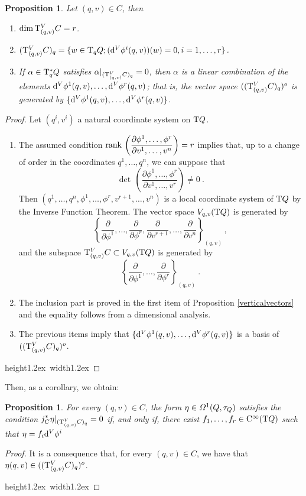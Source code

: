 \documentclass[12pt]{report}
\newtheorem{prop}[teor]{Proposition}
\def\dst{\displaystyle}
\def\derpar#1#2{\frac{\partial{#1}}{\partial{#2}}}
\def\coor#1#2#3{{#1}^{#2}, \ldots, {#1}^{#3}}
\def\moment#1#2#3{{#1}_{#2}, \ldots, {#1}_{#3}}
\def\qed{\ifvmode\removelastskip\fi
{\unskip\nobreak\hfil\penalty50\hbox{}\nobreak\hfil
\hbox{\vrule height1.2ex width1.2ex}\parfillskip=0pt
\finalhyphendemerits=0 \par\smallskip}}
\def\df{{\mit\Omega}}
\def\d{{\rm d}}
\def\Tan{{\rm T}}
\def\Cinfty{{\rm C}^\infty}
\begin{document}
\begin{prop}
Let $(q,v)\in C$, then
\begin{enumerate}
\item $\dim \Tan^V_{(q,v)}C=r$.
\item $(\Tan^V_{(q,v)}C)_{q}=\{w\in \Tan_{q}Q; (\d^V\phi^i(q,v))(w)=0, i=1,\ldots,r \}$.
\item If $\alpha\in\Tan_{q}^{*}Q$ satisfies $\alpha |_{(\Tan^V_{(q,v)}C)_{q}}=0$, then $\alpha$ is a linear combination of the elements $\d^V\phi^1(q,v), \ldots,\d^V\phi^r(q,v)$;
that is, the vector space $((\Tan_{(q,v)}^VC)_q)^o$ is generated by $\{\d^V\phi^1(q,v),\ldots,\d^V\phi^r(q,v)\}$.
\end{enumerate}
\end{prop}
\begin{proof}
Let $(q^{i}, v^{i})$ a natural coordinate system on $\Tan Q$.
\begin{enumerate}
\item The assumed condition
\(\dst {\rm rank}\,\left(\derpar{\coor{\phi}{1}{r}}{\coor{v}{1}{n}}\right)=r\) implies that, up to a change of order in the coordinates $\coor{q}{1}{n}$, we can suppose that
$$
\det\, \left(\derpar{\coor{\phi}{1}{r}}{\coor{v}{1}{r}}\right)\not= 0 \ .
$$
Then $(q^{1},\ldots,q^{n},\phi^1,\ldots,\phi^r,v^{r+1},\ldots,v^{n})$ is a local coordinate system of $\Tan Q$ by the Inverse Function Theorem. The vector space $V_{q,v}(\Tan Q)$ is generated by
$$
\left\{\derpar{}{\phi^1},\ldots,\derpar{}{\phi^r},\derpar{}{v^{r+1}},\ldots,\derpar{}{v^n}\right\}_{(q,v)}\, ,
$$
and the subspace  $\Tan^V_{(q,v)}C\subset V_{q,v}(\Tan Q)$ is generated by
$$
\left\{\derpar{}{\phi^1},\ldots,\derpar{}{\phi^r}\right\}_{(q,v)}\ .
$$
\item The inclusion part is proved in the first item of Proposition \ref{verticalvectors} and the equality follows from a dimensional analysis.
\item 
The previous items imply that $\{\d^V\phi^1(q,v),\ldots,\d^V\phi^r(q,v)\}$ is a basis of $
((\Tan_{(q,v)}^VC)_q)^o$. 
\end{enumerate}
\qed \end{proof}

Then, as a corollary, we obtain:

\begin{prop}
For every $(q,v)\in C$, the form $\eta\in\df^1(Q,\tau_Q)$ satisfies the condition
\(\dst j^*_C\eta\vert_{(\Tan^V_{(q,v)}C)_q}=0\)
if, and only if, there exist $\moment{f}{1}{r}\in\Cinfty (\Tan Q)$
such that $\eta=f_i\d^V\phi^i$
\end{prop}
\begin{proof}
It is a consequence that, for every $(q,v)\in C$, we have that $\eta(q,v)\in((\Tan_{(q,v)}^VC)_q)^o$.
\\ \qed \end{proof}
\end{document}
